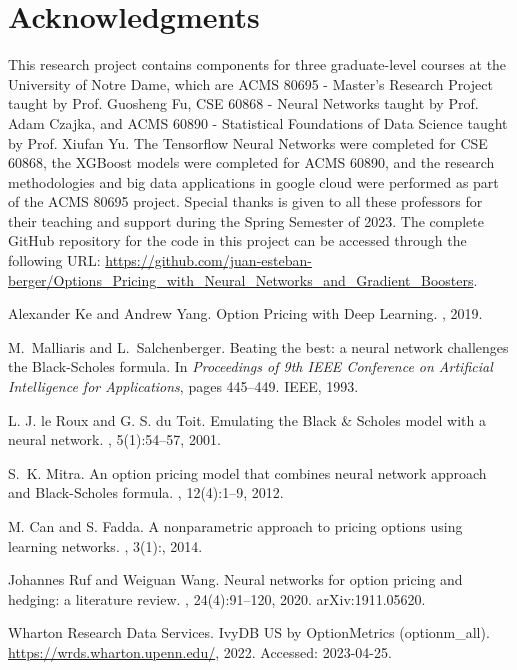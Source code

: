 \documentclass[a4paper]{article}
\begin{document}
\section*{Acknowledgments}

This research project contains components for three graduate-level courses at the University of Notre Dame, which are ACMS 80695 - Master's Research Project taught by Prof. Guosheng Fu, CSE 60868 - Neural Networks taught by Prof. Adam Czajka, and ACMS 60890 - Statistical Foundations of Data Science taught by Prof. Xiufan Yu. The Tensorflow Neural Networks were completed for CSE 60868, the XGBoost models were completed for ACMS 60890, and the research methodologies and big data applications in google cloud were performed as part of the ACMS 80695 project. Special thanks is given to all these professors for their teaching and support during the Spring Semester of 2023. The complete GitHub repository for the code in this project can be accessed through the following URL: \textcolor{blue}{\url{https://github.com/juan-esteban-berger/Options_Pricing_with_Neural_Networks_and_Gradient_Boosters}.}

\begin{thebibliography}{99}

Alexander Ke and Andrew Yang.
\newblock Option Pricing with Deep Learning.
, 2019.

M.~Malliaris and L.~Salchenberger.
\newblock Beating the best: a neural network challenges the Black-Scholes formula.
\newblock In {\em Proceedings of 9th IEEE Conference on Artificial Intelligence for Applications}, pages 445--449. IEEE, 1993.

L. J. le Roux and G. S. du Toit.
\newblock Emulating the Black \& Scholes model with a neural network.
, 5(1):54--57, 2001.

S.~K. Mitra.
\newblock An option pricing model that combines neural network approach and Black-Scholes formula.
, 12(4):1--9, 2012.

M. Can and S. Fadda.
\newblock A nonparametric approach to pricing options using learning networks.
, 3(1):, 2014.

Johannes Ruf and Weiguan Wang.
\newblock Neural networks for option pricing and hedging: a literature review.
, 24(4):91--120, 2020.
\newblock arXiv:1911.05620.

Wharton Research Data Services.
\newblock IvyDB US by OptionMetrics (optionm\_all).
\newblock \url{https://wrds.wharton.upenn.edu/}, 2022.
\newblock Accessed: 2023-04-25.

\end{thebibliography}
\end{document}
